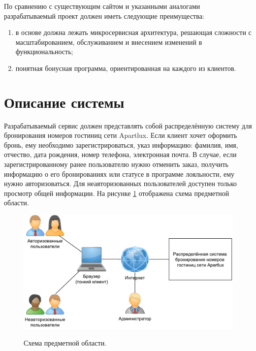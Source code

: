 По сравнению с существующим сайтом и указанными аналогами разрабатываемый проект должен иметь следующие преимущества:
\begin{enumerate}
	\item в основе должна лежать микросервисная архитектура, решающая сложности с масштабированием, обслуживанием и внесением изменений в функциональность;
	
	\item понятная бонусная программа, ориентированная на каждого из клиентов.
\end{enumerate}

\section*{Описание системы}
Разрабатываемый сервис должен представлять собой распределённую систему для бронирования номеров гостиниц сети Apartlux. Если клиент хочет оформить бронь, ему необходимо зарегистрироваться, указ информацию: фамилия, имя, отчество, дата рождения, номер телефона, электронная почта. В случае, если зарегистрированному ранее пользователю нужно отменить заказ, получить информацию о его бронированиях или статусе в программе лояльности, ему нужно авторизоваться. Для неавторизованных пользователей доступен только просмотр общей информации. 
На рисунке \ref{fig:schema} отображена схема предметной области.
\begin{figure}[h]
	\begin{center}
		{\includegraphics[scale = 0.6]{img/pic/general.pdf}}
		\caption{Схема предметной области.}
		\label{fig:schema}
	\end{center}
\end{figure}

\pagebreak

